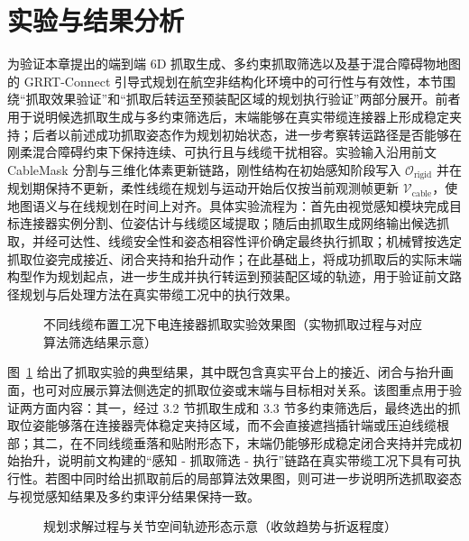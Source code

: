 \section{实验与结果分析}

为验证本章提出的端到端 6D 抓取生成、多约束抓取筛选以及基于混合障碍物地图的 GRRT-Connect 引导式规划在航空非结构化环境中的可行性与有效性，本节围绕“抓取效果验证”和“抓取后转运至预装配区域的规划执行验证”两部分展开。前者用于说明候选抓取生成与多约束筛选后，末端能够在真实带缆连接器上形成稳定夹持；后者以前述成功抓取姿态作为规划初始状态，进一步考察转运路径是否能够在刚柔混合障碍约束下保持连续、可执行且与线缆干扰相容。实验输入沿用前文 CableMask 分割与三维化体素更新链路，刚性结构在初始感知阶段写入 $\mathcal{O}_{\mathrm{rigid}}$ 并在规划期保持不更新，柔性线缆在规划与运动开始后仅按当前观测帧更新 $\mathcal{V}_{\mathrm{cable}}$，使地图语义与在线规划在时间上对齐。具体实验流程为：首先由视觉感知模块完成目标连接器实例分割、位姿估计与线缆区域提取；随后由抓取生成网络输出候选抓取，并经可达性、线缆安全性和姿态相容性评价确定最终执行抓取；机械臂按选定抓取位姿完成接近、闭合夹持和抬升动作；在此基础上，将成功抓取后的实际末端构型作为规划起点，进一步生成并执行转运到预装配区域的轨迹，用于验证前文路径规划与后处理方法在真实带缆工况中的执行效果。

\begin{figure}[htbp]
  \centering
  \caption{不同线缆布置工况下电连接器抓取实验效果图（实物抓取过程与对应算法筛选结果示意）}
  \label{fig:ch3:success-rate}
\end{figure}

图~\ref{fig:ch3:success-rate} 给出了抓取实验的典型结果，其中既包含真实平台上的接近、闭合与抬升画面，也可对应展示算法侧选定的抓取位姿或末端与目标相对关系。该图重点用于验证两方面内容：其一，经过 3.2 节抓取生成和 3.3 节多约束筛选后，最终选出的抓取位姿能够落在连接器壳体稳定夹持区域，而不会直接遮挡插针端或压迫线缆根部；其二，在不同线缆垂落和贴附形态下，末端仍能够形成稳定闭合夹持并完成初始抬升，说明前文构建的“感知 - 抓取筛选 - 执行”链路在真实带缆工况下具有可执行性。若图中同时给出抓取前后的局部算法效果图，则可进一步说明所选抓取姿态与视觉感知结果及多约束评分结果保持一致。

\begin{figure}[htbp]
  \centering
  \caption{规划求解过程与关节空间轨迹形态示意（收敛趋势与折返程度）}
  \label{fig:ch3:boxplot}
\end{figure}

